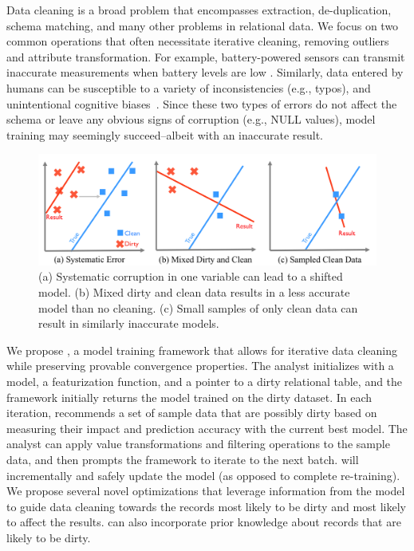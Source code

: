 Data cleaning is a broad problem that encompasses extraction, de-duplication, schema matching, and many other problems in relational data.
We focus on two common operations that often necessitate iterative cleaning, removing outliers and attribute transformation.
For example, battery-powered sensors can transmit inaccurate measurements when battery levels are low \cite{DBLP:conf/pervasive/JefferyAFHW06}. 
Similarly, data entered by humans can be susceptible to a variety of inconsistencies (e.g., typos), and unintentional cognitive biases~\cite{DBLP:conf/recsys/KrishnanPFG14}.
Since these two types of errors do not affect the schema or leave any obvious signs of corruption (e.g., NULL values), model training may seemingly succeed--albeit with an inaccurate result.

\begin{figure}[t]
\centering
 \includegraphics[width=\columnwidth]{figs/update-arch.png}
 \caption{(a) Systematic corruption in one variable can lead to a shifted model. 
 (b) Mixed dirty and clean data results in a less accurate model than no cleaning.
(c) Small samples of only clean data can result in similarly inaccurate models. \label{update-arch1}}
\vspace{-2em}
\end{figure}

We propose \sys, a model training framework that allows for iterative data cleaning while preserving provable convergence properties.
The analyst initializes \sys with a model, a featurization function, and a pointer to a dirty relational table, and the framework initially returns the model trained on the dirty dataset.
In each iteration, \sys recommends a set of sample data that are possibly dirty based on measuring their impact and prediction accuracy with the current best model.
The analyst can apply value transformations and filtering operations to the sample data, and then prompts the framework to iterate to the next batch. 
\sys will incrementally and safely update the model (as opposed to complete re-training).
We propose several novel optimizations that leverage information from the model to guide data cleaning towards the records most likely to be dirty and most likely to affect the results.
\sys can also incorporate prior knowledge about records that are likely to be dirty.

